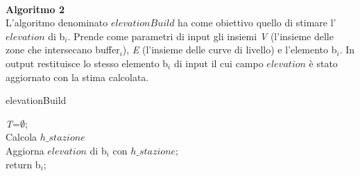 \mbox{}\\
\newline
\newline
\textbf{Algoritmo 2}\\
\newline
L'algoritmo denominato $elevationBuild$ ha come obiettivo quello di stimare l'$elevation$ di b$_i$. Prende come parametri di input gli insiemi \textit{V} (l'insieme delle zone che intersecano buffer$_i$), \textit{E} (l'insieme delle curve di livello) e l'elemento b$_i$. In output restituisce lo stesso elemento b$_i$ di input il cui campo $elevation$ è stato aggiornato con la stima calcolata.\\ 

\begin{algorithm}[H]
	

	\IncMargin{1em}
	\caption{elevationBuild}
	\label{alg:one}
	\BlankLine
	
	\SetAlgoNoLine
	
    \textit{T}=$\emptyset$; \\
    Calcola $h\_stazione$ \\
    Aggiorna $elevation$ di b$_i$ con $h\_stazione$;\\
	return b$_{i}$; \\
	

\end{algorithm}

